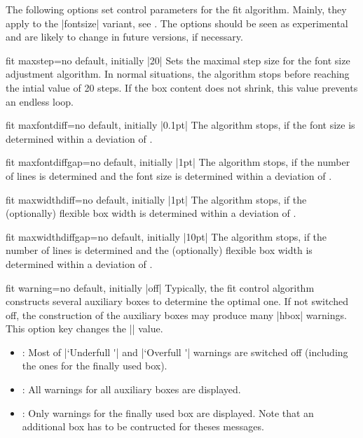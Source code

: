 \clearpage
\begin{marker}
The following options set control parameters for the fit algorithm.
Mainly, they apply to the |fontsize| variant, see .
The options should be seen as experimental and are likely to change in future versions,
if necessary.
\end{marker}

\begin{docTcbKey}{fit maxstep}{=}{no default, initially |20|}
  Sets the maximal step size for the font size adjustment algorithm.
  In normal situations, the algorithm stops before reaching the intial value of 20 steps.
  If the box content does not shrink, this value prevents an endless loop.
\end{docTcbKey}


\begin{docTcbKey}{fit maxfontdiff}{=}{no default, initially |0.1pt|}
  The algorithm stops, if the font size is determined within a deviation of
  .
\end{docTcbKey}


\begin{docTcbKey}{fit maxfontdiffgap}{=}{no default, initially |1pt|}
  The algorithm stops, if the number of lines is determined and the font size is
  determined within a deviation of .
\end{docTcbKey}


\begin{docTcbKey}{fit maxwidthdiff}{=}{no default, initially |1pt|}
  The algorithm stops, if the (optionally) flexible box width
  is determined within a deviation of .
\end{docTcbKey}


\begin{docTcbKey}{fit maxwidthdiffgap}{=}{no default, initially |10pt|}
  The algorithm stops, if the number of lines is determined and the (optionally) flexible box width
  is determined within a deviation of .
\end{docTcbKey}


\begin{docTcbKey}{fit warning}{=}{no default, initially |off|}
  Typically, the fit control algorithm constructs several auxiliary boxes
  to determine the optimal one. If not switched off, the construction of
  the auxiliary boxes may produce many |hbox| warnings. This option key
  changes the |\hbadness| value.
  \begin{itemize}
  \item{}: Most of |`Underfull \hbox'| and |`Overfull \hbox'| warnings are
    switched off (including the ones for the finally used box).
  \item{}: All warnings for all auxiliary boxes are displayed.
  \item{}: Only warnings for the finally used box are displayed.
    Note that an additional box has to be contructed for theses messages.
  \end{itemize}
\end{docTcbKey}


